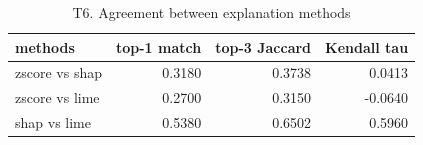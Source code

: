 \begin{table}
\caption{T6. Agreement between explanation methods}
\begin{tabular}{lrrr}
\toprule
methods & top-1 match & top-3 Jaccard & Kendall tau \\
\midrule
zscore vs shap & 0.3180 & 0.3738 & 0.0413 \\
zscore vs lime & 0.2700 & 0.3150 & -0.0640 \\
shap vs lime & 0.5380 & 0.6502 & 0.5960 \\
\bottomrule
\end{tabular}
\end{table}
